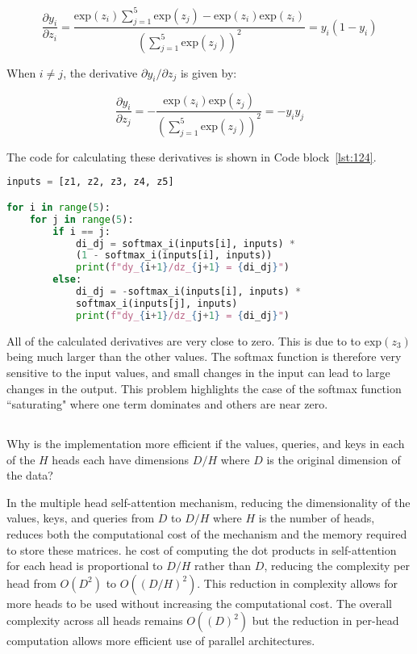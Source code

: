 \documentclass[12pt]{report}
\begin{document}
\begin{equation}
    \frac{\partial y_{i}}{\partial z_{i}} = \frac{\text{exp}(z_{i})\sum_{j=1}^{5}\text{exp}(z_{j}) - \text{exp}(z_{i})\text{exp}(z_{i})}{\left(\sum_{j=1}^{5}\text{exp}(z_{j})\right)^{2}} = y_{i}(1 - y_{i})
\end{equation}

When $i \neq j$, the derivative $\partial y_{i}/\partial z_{j}$ is given by:

\begin{equation}
    \frac{\partial y_{i}}{\partial z_{j}} = -\frac{\text{exp}(z_{i})\text{exp}(z_{j})}{\left(\sum_{j=1}^{5}\text{exp}(z_{j})\right)^{2}} = -y_{i}y_{j}
\end{equation}

The code for calculating these derivatives is shown in Code block~\ref{lst:124}.
\vspace{5pt}
\begin{lstlisting}[language=Python, caption=Calculate 25 derivates, label=lst:124]
inputs = [z1, z2, z3, z4, z5]

for i in range(5):
    for j in range(5):
        if i == j:
            di_dj = softmax_i(inputs[i], inputs) * 
            (1 - softmax_i(inputs[i], inputs))
            print(f"dy_{i+1}/dz_{j+1} = {di_dj}")
        else:
            di_dj = -softmax_i(inputs[i], inputs) * 
            softmax_i(inputs[j], inputs)
            print(f"dy_{i+1}/dz_{j+1} = {di_dj}")
\end{lstlisting}

All of the calculated derivatives are very close to zero. This is due to to $\text{exp}(z_{3})$ being much larger than the other values. The softmax function is therefore very sensitive to the input values, and small changes in the input can lead to large changes in the output. This problem highlights the case of the softmax function ``saturating" where one term dominates and others are near zero.

\subsection{}
\begin{mdframed}
    Why is the implementation more efficient if the values, queries, and keys in each of the $H$ heads each have dimensions $D/H$ where $D$ is the original dimension of the data?
\end{mdframed}

In the multiple head self-attention mechanism, reducing the dimensionality of the values, keys, and queries from $D$ to $D/H$ where $H$ is the number of heads, reduces both the computational cost of the mechanism and the memory required to store these matrices. he cost of computing the dot products in self-attention for each head is proportional to $D/H$ rather than $D$, reducing the complexity per head from $O(D^{2})$ to $O((D/H)^{2})$. This reduction in complexity allows for more heads to be used without increasing the computational cost. The overall complexity across all heads remains $O((D)^{2})$ but the reduction in per-head computation allows more efficient use of parallel architectures.
\end{document}
